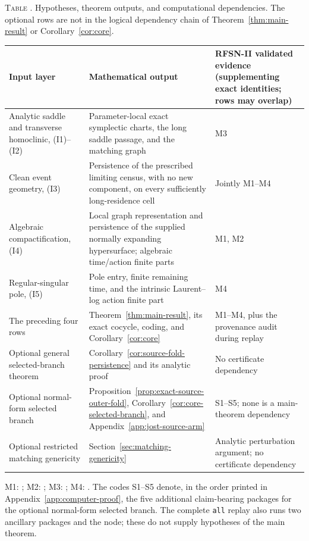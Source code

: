 \documentclass[11pt]{amsart}
\numberwithin{equation}{section}
\theoremstyle{definition}
\theoremstyle{remark}
\begin{document}
\begin{center}
\parbox{\textwidth}{\small\textsc{Table \thetable.}
Hypotheses, theorem outputs, and computational dependencies.  The optional
rows are not in the logical dependency chain of
Theorem~\ref{thm:main-result} or Corollary~\ref{cor:core}.
\label{tab:proof-dependency}}
\smallskip
\small
\begin{tabularx}{\textwidth}{@{}
  >{\raggedright\arraybackslash}p{}
  Y
  >{\raggedright\arraybackslash}p{.27\textwidth}@{}}
\hline
Input layer & Mathematical output & RFSN-II validated evidence
(supplementing exact identities; rows may overlap) \\
\hline
Analytic saddle and transverse homoclinic, \textup{(I1)}--\textup{(I2)}
& Parameter-local exact symplectic charts, the long saddle passage, and
the matching graph
& M3 \\
Clean event geometry, \textup{(I3)}
& Persistence of the prescribed limiting census, with no new component,
on every sufficiently long-residence cell
& Jointly M1--M4 \\
Algebraic compactification, \textup{(I4)}
& Local graph representation and persistence of the supplied normally
expanding hypersurface; algebraic time/action finite parts
& M1, M2 \\
Regular-singular pole, \textup{(I5)}
& Pole entry, finite remaining time, and the intrinsic Laurent--log action
finite part
& M4 \\
The preceding four rows
& Theorem~\ref{thm:main-result}, its exact cocycle, coding, and
Corollary~\ref{cor:core}
& M1--M4, plus the provenance audit during replay \\
Optional general selected-branch theorem
& Corollary~\ref{cor:source-fold-persistence} and its analytic proof
& No certificate dependency \\
Optional normal-form selected branch
& Proposition~\ref{prop:exact-source-outer-fold},
Corollary~\ref{cor:core-selected-branch}, and
Appendix~\ref{app:jost-source-arm}
& S1--S5; none is a main-theorem dependency \\
Optional restricted matching genericity
& Section~\ref{sec:matching-genericity}
& Analytic perturbation argument; no certificate dependency \\
\hline
\end{tabularx}
\end{center}

\begingroup\small
\noindent
M1: ;
M2: ;
M3: ;
M4: .
The codes S1--S5 denote, in the order printed in
Appendix~\ref{app:computer-proof}, the five additional claim-bearing
packages for the optional normal-form selected branch.  The complete
\texttt{all} replay also runs two ancillary packages and the
 node; these do not supply hypotheses of the
main theorem.
\endgroup
\end{document}
